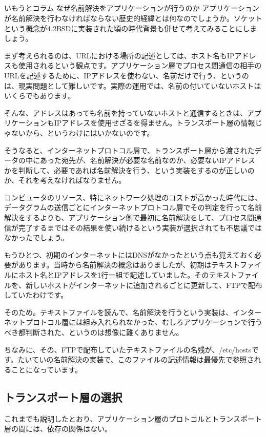 \subsection*{}
\begin{itembox}[l]{いもうとコラム なぜ名前解決をアプリケーションが行うのか}
アプリケーションが名前解決を行わなければならない歴史的経緯とは何なのでしょうか。ソケットという概念が4.2BSDに実装された頃の時代背景も併せて考えてみることにしましょう。

まず考えられるのは、URLにおける場所の記述としては、ホスト名もIPアドレスも使用されるという観点です。アプリケーション層でプロセス間通信の相手のURLを記述するために、IPアドレスを使わない、名前だけで行う、というのは、現実問題として難しいです。実際の運用では、名前の付いていないホストはいくらでもあります。

そんな、アドレスはあっても名前を持っていないホストと通信するときは、アプリケーションもIPアドレスを使用せざるを得ません。トランスポート層の情報じゃないから、というわけにはいかないのです。

そうなると、インターネットプロトコル層で、トランスポート層から渡されたデータの中にあった宛先が、名前解決が必要な名前なのか、必要ないIPアドレスかを判断して、必要であれば名前解決を行う、という実装をするのが正しいのか、それを考えなければなりません。

コンピュータのリソース、特にネットワーク処理のコストが高かった時代には、データグラムの送信ごとにインターネットプロトコル層でその判定を行って名前解決をするよりも、アプリケーション側で最初に名前解決をして、プロセス間通信が完了するまではその結果を使い続けるという実装が選択されても不思議ではなかったでしょう。

もうひとつ、初期のインターネットにはDNSがなかったという点も覚えておく必要があります。当時から名前解決の概念はありましたが、初期はテキストファイルにホスト名とIPアドレスを1行一組で記述していました。そのテキストファイルを、新しいホストがインターネットに追加されるごとに更新して、FTPで配布していたわけです。

そのため。テキストファイルを読んで、名前解決を行うという実装は、インターネットプロトコル層には組み入れられなかった、むしろアプリケーションで行うべき都判断された、というのは想像に難くありません。

ちなみに、その、FTPで配布していたテキストファイルの名残が、/etc/hostsです。たいていの名前解決の実装で、このファイルの記述情報は最優先で参照されることになっています。

\end{itembox}

\subsection{トランスポート層の選択}
これまでも説明したとおり、アプリケーション層のプロトコルとトランスポート層の間には、依存の関係はない。

